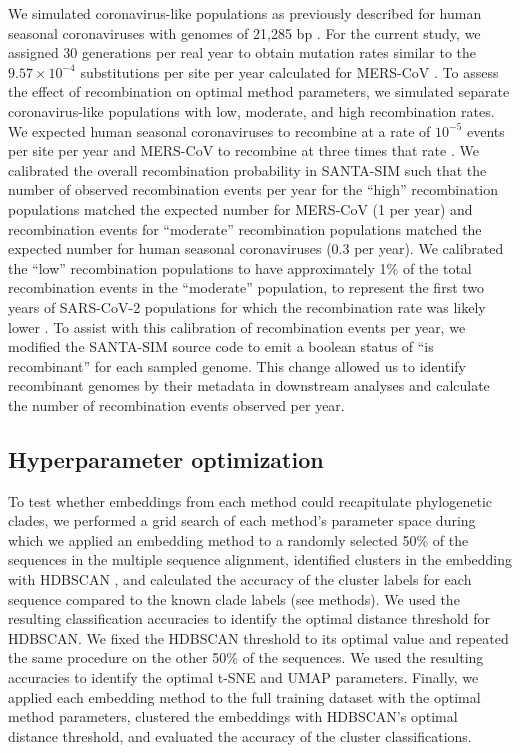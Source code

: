\documentclass[10pt,letterpaper]{article}
\begin{document}
We simulated coronavirus-like populations as previously described for human seasonal coronaviruses with genomes of 21,285 bp \cite{Muller2022}.
For the current study, we assigned 30 generations per real year to obtain mutation rates similar to the $9.57 \times 10^{-4}$ substitutions per site per year calculated for MERS-CoV \cite{Dudas2018}.
To assess the effect of recombination on optimal method parameters, we simulated separate coronavirus-like populations with low, moderate, and high recombination rates.
We expected human seasonal coronaviruses to recombine at a rate of $10^{-5}$ events per site per year and MERS-CoV to recombine at three times that rate \cite{Muller2022}.
We calibrated the overall recombination probability in SANTA-SIM such that the number of observed recombination events per year for the ``high'' recombination populations matched the expected number for MERS-CoV (1 per year) and recombination events for ``moderate'' recombination populations matched the expected number for human seasonal coronaviruses (0.3 per year).
We calibrated the ``low'' recombination populations to have approximately 1\% of the total recombination events in the ``moderate'' population, to represent the first two years of SARS-CoV-2 populations for which the recombination rate was likely lower \cite{Carabelli2023}.
To assist with this calibration of recombination events per year, we modified the SANTA-SIM source code to emit a boolean status of ``is recombinant'' for each sampled genome.
This change allowed us to identify recombinant genomes by their metadata in downstream analyses and calculate the number of recombination events observed per year.

\subsection*{Hyperparameter optimization}

To test whether embeddings from each method could recapitulate phylogenetic clades, we performed a grid search of each method's parameter space during which we applied an embedding method to a randomly selected 50\% of the sequences in the multiple sequence alignment, identified clusters in the embedding with HDBSCAN \cite{hdbscan}, and calculated the accuracy of the cluster labels for each sequence compared to the known clade labels (see methods).
We used the resulting classification accuracies to identify the optimal distance threshold for HDBSCAN.
We fixed the HDBSCAN threshold to its optimal value and repeated the same procedure on the other 50\% of the sequences.
We used the resulting accuracies to identify the optimal t-SNE and UMAP parameters.
Finally, we applied each embedding method to the full training dataset with the optimal method parameters, clustered the embeddings with HDBSCAN's optimal distance threshold, and evaluated the accuracy of the cluster classifications.
\end{document}
